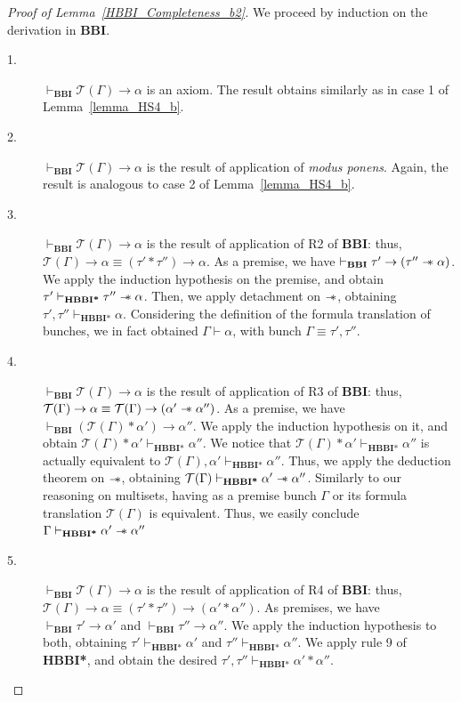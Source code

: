 \documentclass[a4paper]{article}
\newcommand\magicwand{\mathrel{-\mkern-6mu*}}
\newcommand{\BBI}{\textbf{BBI}\xspace}
\begin{document}
\begin{proof}[Proof of Lemma~\ref{HBBI_Completeness_b2}]
  We proceed by induction on the derivation in \BBI.
\begin{description}

    \item[1.] $\vdash_{\BBI}\mathcal{T} (\Gamma) \rightarrow \alpha$ is an axiom. The result obtains similarly as in case 1 of Lemma~\ref{lemma_HS4_b}.

    \item[2.] $\vdash_{\BBI}\mathcal{T} (\Gamma) \rightarrow \alpha$ is the result of application of \textit{modus ponens}. Again, the result is analogous to case 2 of Lemma~\ref{lemma_HS4_b}.

    \item[3.] $\vdash_{\BBI}\mathcal{T} (\Gamma) \rightarrow \alpha$ is the result of application of R2 of \BBI: thus, $\mathcal{T} (\Gamma) \rightarrow \alpha \equiv (\tau' * \tau'') \rightarrow \alpha$. As a premise, we have $\vdash_{\BBI} \tau' \rightarrow (\tau'' \magicwand \alpha)$. We apply the induction hypothesis on the premise, and obtain $\tau'\vdash_{\textbf{HBBI*}}  \tau'' \magicwand \alpha$. Then, we apply detachment on $\magicwand$, obtaining $\tau', \tau''\vdash_{\textbf{HBBI*}} \alpha$. Considering the definition of the formula translation of bunches, we in fact obtained $\Gamma \vdash \alpha$, with bunch $\Gamma \equiv \tau', \tau''$. 

    \item[4.] $\vdash_{\BBI}\mathcal{T} (\Gamma) \rightarrow \alpha$ is the result of application of R3 of \BBI: thus, $\mathcal{T} (\Gamma) \rightarrow \alpha \equiv \mathcal{T} (\Gamma) \rightarrow (\alpha' \magicwand \alpha'')$. As a premise, we have $\vdash_{\BBI} (\mathcal{T} (\Gamma) *\alpha') \rightarrow \alpha''$. We apply the induction hypothesis on it, and obtain $\mathcal{T}(\Gamma)* \alpha' \vdash_{\textbf{HBBI*}} \alpha''$. We notice that $\mathcal{T}(\Gamma)* \alpha' \vdash_{\textbf{HBBI*}} \alpha''$ is actually equivalent to $\mathcal{T}(\Gamma), \alpha' \vdash_{\textbf{HBBI*}} \alpha''$. Thus, we apply the deduction theorem on $\magicwand$, obtaining $\mathcal{T}(\Gamma) \vdash_{\textbf{HBBI*}}\alpha' \magicwand \alpha''$. Similarly to our reasoning on multisets, having as a premise bunch $\Gamma$ or its formula translation $\mathcal{T}(\Gamma)$ is equivalent. Thus, we easily conclude $\Gamma \vdash_{\textbf{HBBI*}}\alpha' \magicwand \alpha''$

    \item[5.] $\vdash_{\BBI}\mathcal{T} (\Gamma) \rightarrow \alpha$ is the result of application of R4 of \BBI: thus, $\mathcal{T} (\Gamma) \rightarrow \alpha \equiv (\tau'*\tau'') \rightarrow (\alpha' * \alpha'')$. As premises, we have $\vdash_{\BBI}\tau' \rightarrow \alpha'$ and $\vdash_{\BBI}\tau'' \rightarrow \alpha''$. We apply the induction hypothesis to both, obtaining $\tau'\vdash_{\textbf{HBBI*}} \alpha'$ and $\tau''\vdash_{\textbf{HBBI*}} \alpha''$. We apply rule 9 of \textbf{HBBI*}, and obtain the desired $\tau', \tau''\vdash_{\textbf{HBBI*}} \alpha'*\alpha''$.


\end{description}
\end{proof}
\end{document}
